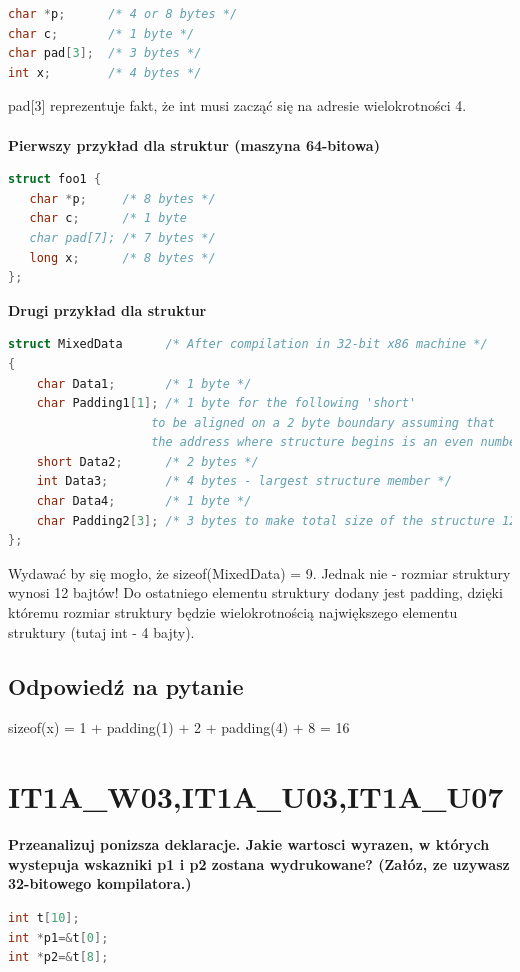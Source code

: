 \begin{lstlisting}[language=c]
char *p;      /* 4 or 8 bytes */
char c;       /* 1 byte */
char pad[3];  /* 3 bytes */
int x;        /* 4 bytes */
\end{lstlisting}
pad[3] reprezentuje fakt, że int musi zacząć się na adresie wielokrotności 4. \\\\
\textbf{Pierwszy przykład dla struktur (maszyna 64-bitowa)}
\begin{lstlisting}[language=c]
struct foo1 {
   char *p;     /* 8 bytes */
   char c;      /* 1 byte
   char pad[7]; /* 7 bytes */
   long x;      /* 8 bytes */
};
\end{lstlisting}
\textbf{Drugi przykład dla struktur}
\begin{lstlisting}[language=c]
struct MixedData      /* After compilation in 32-bit x86 machine */
{
    char Data1;       /* 1 byte */
    char Padding1[1]; /* 1 byte for the following 'short'
	                to be aligned on a 2 byte boundary assuming that
	                the address where structure begins is an even number */
    short Data2;      /* 2 bytes */
    int Data3;        /* 4 bytes - largest structure member */
    char Data4;       /* 1 byte */
    char Padding2[3]; /* 3 bytes to make total size of the structure 12 bytes */
};
\end{lstlisting}
Wydawać by się mogło, że sizeof(MixedData) = 9. Jednak nie - rozmiar struktury wynosi 12 bajtów! Do ostatniego elementu struktury dodany jest padding, dzięki któremu rozmiar struktury będzie wielokrotnością największego elementu struktury (tutaj int - 4 bajty).

\subsection{Odpowiedź na pytanie} 
sizeof(x) = 1 + padding(1) + 2 + padding(4) + 8 = 16 


\section{IT1A\_W03,IT1A\_U03,IT1A\_U07}
\textbf{Przeanalizuj ponizsza deklaracje. Jakie wartosci wyrazen, w których wystepuja wskazniki p1 i p2 zostana wydrukowane? (Załóz, ze uzywasz 32-bitowego kompilatora.)}
\begin{lstlisting}[language=c]
int t[10];
int *p1=&t[0];
int *p2=&t[8];
\end{lstlisting}

